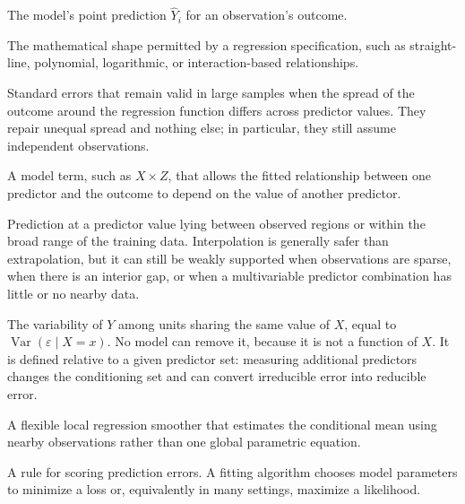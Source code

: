 \documentclass[11pt]{report}
\newcommand{\Var}{\operatorname{Var}}
\begin{document}
\begin{description}[style=nextline,leftmargin=0pt,labelindent=0pt,font=\bfseries]
\item[Fitted value] The model's point prediction \(\widehat{Y}_i\) for an observation's outcome.

\item[Functional form] The mathematical shape permitted by a regression specification, such as straight-line, polynomial, logarithmic, or interaction-based relationships.

\item[Heteroskedasticity-robust standard errors] Standard errors that remain valid in large samples when the spread of the outcome around the regression function differs across predictor values. They repair unequal spread and nothing else; in particular, they still assume independent observations.

\item[Interaction] A model term, such as \(X\times Z\), that allows the fitted relationship between one predictor and the outcome to depend on the value of another predictor.

\item[Interpolation] Prediction at a predictor value lying between observed regions or within the broad range of the training data. Interpolation is generally safer than extrapolation, but it can still be weakly supported when observations are sparse, when there is an interior gap, or when a multivariable predictor combination has little or no nearby data.

\item[Irreducible error] The variability of \(Y\) among units sharing the same value of \(X\), equal to \(\Var(\varepsilon\mid X=x)\). No model can remove it, because it is not a function of \(X\). It is defined relative to a given predictor set: measuring additional predictors changes the conditioning set and can convert irreducible error into reducible error.

\item[LOESS] A flexible local regression smoother that estimates the conditional mean using nearby observations rather than one global parametric equation.

\item[Loss function] A rule for scoring prediction errors. A fitting algorithm chooses model parameters to minimize a loss or, equivalently in many settings, maximize a likelihood.


\end{description}
\end{document}
